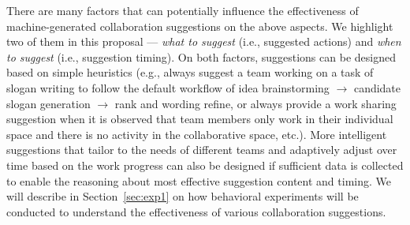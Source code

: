 There are many factors that can potentially influence the effectiveness of machine-generated collaboration suggestions on the above aspects. We highlight two of them in this proposal --- {\em what to suggest} (i.e., suggested actions) and {\em when to suggest} (i.e., suggestion timing). On both factors, suggestions can be designed based on simple heuristics (e.g., always suggest a team working on a task of slogan writing to follow the default workflow of idea brainstorming $\rightarrow$ candidate slogan generation $\rightarrow$ rank and wording refine, or always provide a work sharing suggestion when it is observed that team members only work in their individual space and there is no activity in the collaborative space, etc.). More intelligent suggestions that tailor to the needs of different teams and adaptively adjust over time based on the work progress can also be designed if sufficient data is collected to enable the reasoning about most effective suggestion content and timing. We will describe in Section~\ref{sec:exp1} on how behavioral experiments will be conducted to understand the effectiveness of various collaboration suggestions.





